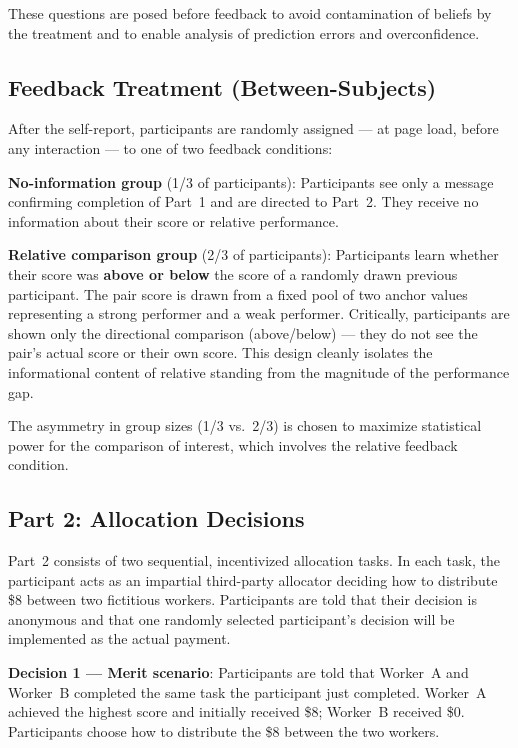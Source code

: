 \documentclass[12pt]{article}
\begin{document}
These questions are posed before feedback to avoid contamination of beliefs by the treatment and to enable analysis of prediction errors and overconfidence.

\subsection{Feedback Treatment (Between-Subjects)}

After the self-report, participants are randomly assigned — at page load, before any interaction — to one of two feedback conditions:

\textbf{No-information group} (1/3 of participants): Participants see only a message confirming completion of Part~1 and are directed to Part~2. They receive no information about their score or relative performance.

\textbf{Relative comparison group} (2/3 of participants): Participants learn whether their score was \textbf{above or below} the score of a randomly drawn previous participant. The pair score is drawn from a fixed pool of two anchor values representing a strong performer and a weak performer. Critically, participants are shown only the directional comparison (above/below) — they do not see the pair's actual score or their own score. This design cleanly isolates the informational content of relative standing from the magnitude of the performance gap.

The asymmetry in group sizes (1/3 vs.\ 2/3) is chosen to maximize statistical power for the comparison of interest, which involves the relative feedback condition.

\subsection{Part 2: Allocation Decisions}

Part~2 consists of two sequential, incentivized allocation tasks. In each task, the participant acts as an impartial third-party allocator deciding how to distribute \$8 between two fictitious workers. Participants are told that their decision is anonymous and that one randomly selected participant's decision will be implemented as the actual payment.

\textbf{Decision 1 — Merit scenario}: Participants are told that Worker~A and Worker~B completed the same task the participant just completed. Worker~A achieved the highest score and initially received \$8; Worker~B received \$0. Participants choose how to distribute the \$8 between the two workers.
\end{document}
